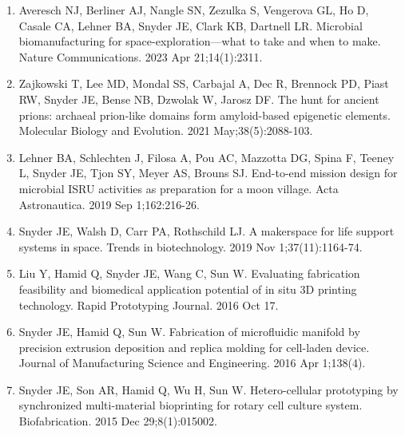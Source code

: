 \documentclass[11pt]{article}
\begin{document}
\begin{singlespace}
\begin{flushleft}
\begin{enumerate} [ leftmargin=*]
\item Averesch NJ, Berliner AJ, Nangle SN, Zezulka S, Vengerova GL, Ho D, Casale CA, Lehner BA, Snyder JE, Clark KB, Dartnell LR. Microbial biomanufacturing for space-exploration—what to take and when to make. Nature Communications. 2023 Apr 21;14(1):2311. \href{https://www.nature.com/articles/s41467-023-37910-1}{\color{linkcolor}{https://www.nature.com/articles/s41467-023-37910-1}}

\item Zajkowski T, Lee MD, Mondal SS, Carbajal A, Dec R, Brennock PD, Piast RW, Snyder JE, Bense NB, Dzwolak W, Jarosz DF. The hunt for ancient prions: archaeal prion-like domains form amyloid-based epigenetic elements. Molecular Biology and Evolution. 2021 May;38(5):2088-103. \href{https://doi.org/10.1093/molbev/msab010}{\color{linkcolor}{https://doi.org/10.1093/molbev/msab010}}

\item Lehner BA, Schlechten J, Filosa A, Pou AC, Mazzotta DG, Spina F, Teeney L, Snyder JE, Tjon SY, Meyer AS, Brouns SJ. End-to-end mission design for microbial ISRU activities as preparation for a moon village. Acta Astronautica. 2019 Sep 1;162:216-26. \href{https://doi.org/10.1016/j.actaastro.2019.06.001}{\color{linkcolor}{https://doi.org/10.1016/j.actaastro.2019.06.001}}

\item Snyder JE, Walsh D, Carr PA, Rothschild LJ. A makerspace for life support systems in space. Trends in biotechnology. 2019 Nov 1;37(11):1164-74. \href{https://doi.org/10.1016/j.tibtech.2019.05.003}{\color{linkcolor}{https://doi.org/10.1016/j.tibtech.2019.05.003}}

\item Liu Y, Hamid Q, Snyder JE, Wang C, Sun W. Evaluating fabrication feasibility and biomedical application potential of in situ 3D printing technology. Rapid Prototyping Journal. 2016 Oct 17. \href{https://doi.org/10.1108/RPJ-07-2015-0090}{\color{linkcolor}{https://doi.org/10.1108/RPJ-07-2015-0090}}

\item Snyder JE, Hamid Q, Sun W. Fabrication of microfluidic manifold by precision extrusion deposition and replica molding for cell-laden device. Journal of Manufacturing Science and Engineering. 2016 Apr 1;138(4). \href{ https://doi.org/10.1115/1.4031551}{\color{linkcolor}{ https://doi.org/10.1115/1.4031551}}

\item Snyder JE, Son AR, Hamid Q, Wu H, Sun W. Hetero-cellular prototyping by synchronized multi-material bioprinting for rotary cell culture system. Biofabrication. 2015 Dec 29;8(1):015002. \href{https://doi.org/10.1088/1758-5090/8/1/015002}{\color{linkcolor}{https://doi.org/10.1088/1758-5090/8/1/015002}}


\end{enumerate}
\end{flushleft}
\end{singlespace}
\end{document}
